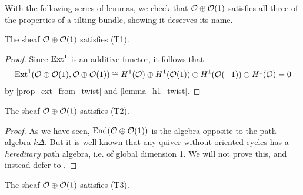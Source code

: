 With the following series of lemmas, we check that $\mathcal{O} \oplus \mathcal{O}({1})$
satisfies all three of the properties of a tilting bundle, showing it
deserves its name.

\begin{lemma}
  The sheaf $\mathcal{O} \oplus \mathcal{O}({1})$ satisfies (T1).
\end{lemma}

\begin{proof}
  Since $\operatorname{Ext}^{{1}}$ is an additive functor, it follows that
  \begin{align*}
    \operatorname{Ext}^{{1}}(\mathcal{O} \oplus \mathcal{O}({1}), \mathcal{O} \oplus \mathcal{O}({1}))
    \cong H^1(\mathcal{O}) \oplus H^1(\mathcal{O}({1})) \oplus H^1(\mathcal{O}({-1}))
    \oplus H^1(\mathcal{O}) = 0
  \end{align*}
  by \cref{prop_ext_from_twist} and \cref{lemma_h1_twist}.
\end{proof}

\begin{lemma}
  The sheaf $\mathcal{O} \oplus \mathcal{O}({1})$ satisfies (T2).
\end{lemma}

\begin{proof}
  As we have seen, $\operatorname{End}(\mathcal{O} \oplus \mathcal{O}({1}))$ is the algebra opposite to the
  path algebra $k \Delta$.
  But it is well known that any quiver without oriented cycles has a
  \emph{hereditary} path algebra, i.e. of global dimension 1.
  We will not prove this, and instead defer to
  \cite[Proposition~III.1.4]{auslander_reiten_smalo}.
\end{proof}

\begin{lemma}
  The sheaf $\mathcal{O} \oplus \mathcal{O}({1})$ satisfies (T3).
\end{lemma}

